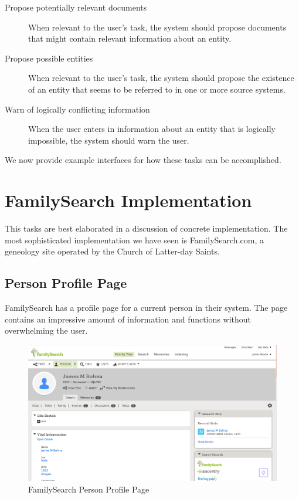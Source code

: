 \documentclass[format=siggraph, review=true]{acmart}
\begin{document}
\begin{description}
\item[Propose potentially relevant documents] When relevant to the
  user's task, the system should propose documents that might
  contain relevant information about an entity.
\item[Propose possible entities] When relevant to the user's task, the
  system should propose the existence of an entity that seems to be
  referred to in one or more source systems.
\item[Warn of logically conflicting information] When the user enters in
  information about an entity that is logically impossible, the system
  should warn the user.
\end{description}

We now provide example interfaces for how these tasks can be
accomplished.

\section{FamilySearch Implementation}
This tasks are best elaborated in a discussion of concrete
implementation. The most sophisticated implementation we have seen is
FamilySearch.com, a geneology site operated by the Church of
Latter-day Saints. 

\subsection{Person Profile Page}
FamilySearch has a profile page for a current person in their
system. The page contains an impressive amount of information and
functions without overwhelming the user.

\begin{figure}[h]

\includegraphics[width=\columnwidth]{images/familysearch/person-detail-1.png}

\caption{FamilySearch Person Profile Page}
\end{figure}
\end{document}
